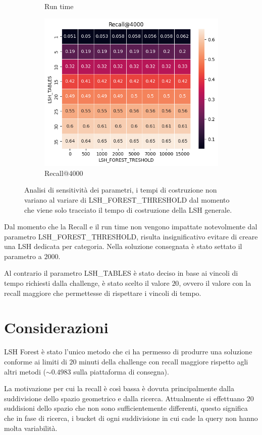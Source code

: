 \begin{figure}[!h]
\begin{subfigure}{.5\textwidth}
      \caption{Run time}
      \label{fig:run_time}
    \end{subfigure}
    \begin{subfigure}{.5\textwidth}
      \centering
      \includegraphics[width=.8\linewidth]{img/recall.png}
      \caption{Recall@4000}
      \label{fig:recall}
    \end{subfigure}
    \caption{Analisi di sensitività dei parametri, i tempi di costruzione non 
    variano al variare di LSH\_FOREST\_THRESHOLD dal momento che viene solo tracciato 
    il tempo di costruzione della LSH generale.}
    \label{fig:sensitivity}
\end{figure}

Dal momento che la Recall e il run time non vengono impattate notevolmente dal
parametro LSH\_FOREST\_THRESHOLD, risulta insignificativo evitare di creare una 
LSH dedicata per categoria. Nella soluzione consegnata è stato settato il 
parametro a $2000$.

Al contrario il parametro LSH\_TABLES è stato deciso in base ai vincoli di tempo 
richiesti dalla challenge, è stato scelto il valore $20$, ovvero il valore con la 
recall maggiore che permettesse di rispettare i vincoli di tempo. 

\section{Considerazioni}
LSH Forest è stato l'unico metodo che ci ha permesso di produrre una soluzione 
conforme ai limiti di $20$ minuti della challenge con recall maggiore rispetto
agli altri metodi ($\sim 0.4983$ sulla piattaforma di consegna). 

La motivazione per cui la recall è così bassa è dovuta principalmente dalla suddivisione 
dello spazio geometrico e dalla ricerca. Attualmente si effettuano $20$ suddisioni
dello spazio che non sono sufficientemente differenti, questo significa che in 
fase di ricerca, i bucket di ogni suddivisione in cui cade la query non hanno molta 
variabilità.

